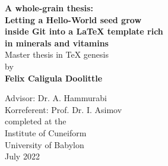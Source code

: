 \begin{titlepage}
\begin{center}
\vspace*{0.4cm}
\textbf{\LARGE
A whole-grain thesis: \\
\vspace*{0.2cm}
Letting a Hello-World seed grow \\
inside Git into a LaTeX template rich \\
in minerals and vitamins \\
}
\vspace*{2.5cm}
Master thesis in TeX genesis\\
\vspace*{0.3cm}
by\\
\vspace*{0.3cm}
{\large \textbf{Felix Caligula Doolittle}}\\
\vspace*{1.5cm}

Advisor: Dr. A. Hammurabi\\
Korreferent: Prof. Dr. I. Asimov\\

\vspace*{4.8cm}
completed at the\\
Institute of Cuneiform \\
University of Babylon\\
\vspace*{0.8cm}
July 2022
\end{center}

\end{titlepage}
